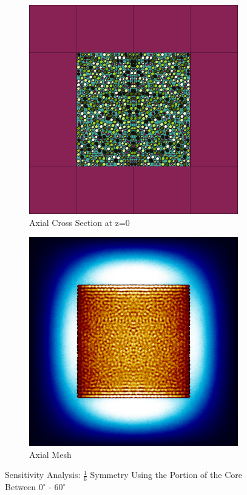\begin{figure}[H]
\begin{subfigure}{0.45\textwidth}
  \includegraphics[width=0.95\linewidth]{figures/0-60/0-60-v}
  \caption{Axial Cross Section at z=0 }
  \label{fig:0-60-v}
\end{subfigure}
%
\begin{subfigure}{0.45\textwidth}
  \includegraphics[width=0.95\linewidth]{figures/0-60/0-60-vm}
  \caption{Axial Mesh}
  \label{fig:0-60-vm}
\end{subfigure}
%
\caption{Sensitivity Analysis: $\frac{1}{6}$ Symmetry Using the Portion of the Core Between $0^{\circ}$ - $60^{\circ}$}
\label{fig:0-60}
\end{figure}